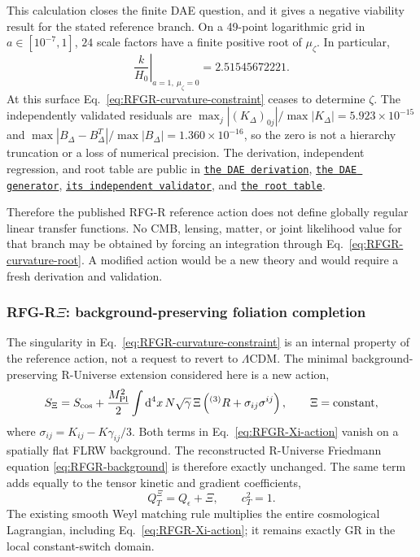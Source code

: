 \documentclass[11pt,a4paper]{article}
\renewcommand{\dd}{\mathrm{d}}
\newcommand{\mpl}{M_{\rm Pl}}
\newcommand{\RFGRepoURL}{https://github.com/MartinPetrasek123/MartinPetrasek123}
\newcommand{\RFGRepoNamed}[2]{\href{\RFGRepoURL/blob/main/r-universe-complete-chain/rfg-r-completion/r\_universe\_completion/#1}{\texttt{#2}}}
\begin{document}
This calculation closes the finite DAE question, and it gives a negative
viability result for the stated reference branch. On a 49-point logarithmic
grid in \(a\in[10^{-7},1]\), \(24\) scale factors have a finite positive root
of \(\mu_\zeta\). In particular,
\begin{equation}
 \left.\frac{k}{H_0}\right|_{a=1,\ \mu_\zeta=0}=2.51545672221 .
 \label{eq:RFGR-curvature-root}
\end{equation}
At this surface Eq.~\eqref{eq:RFGR-curvature-constraint} ceases to determine
\(\zeta\). The independently validated residuals are
\(\max_j|(K_\Delta)_{0j}|/\max|K_\Delta|=5.923\times10^{-15}\) and
\(\max|B_\Delta-B_\Delta^T|/\max|B_\Delta|=1.360\times10^{-16}\), so the
zero is not a hierarchy truncation or a loss of numerical precision. The
derivation, independent regression, and root table are public in
\RFGRepoNamed{docs/rfg\_dae\_closure.md}{the DAE derivation},
\RFGRepoNamed{scripts/rfg\_dae\_closure.py}{the DAE generator},
\RFGRepoNamed{scripts/validate\_rfg\_dae\_closure.py}{its independent validator}, and
\RFGRepoNamed{generated/tables/multifluid\_dae\_closure.csv}{the root table}.

Therefore the published RFG-R reference action does not define globally
regular linear transfer functions. No CMB, lensing, matter, or joint
likelihood value for that branch may be obtained by forcing an integration
through Eq.~\eqref{eq:RFGR-curvature-root}. A modified action would be a new
theory and would require a fresh derivation and validation.

\subsubsection{RFG-R\texorpdfstring{\(\Xi\)}{Xi}: background-preserving foliation completion}
\label{sec:rfgr-xi-completion}

The singularity in Eq.~\eqref{eq:RFGR-curvature-constraint} is an internal
property of the reference action, not a request to revert to \(\Lambda\)CDM.
The minimal background-preserving R-Universe extension considered here is a
new action,
\begin{equation}
 S_{\Xi}=S_{\rm cos}+
 \frac{\mpl^2}{2}\int\dd^4x\,N\sqrt{\gamma}\,
 \Xi\left({}^{(3)}R+\sigma_{ij}\sigma^{ij}\right),
 \qquad \Xi=\text{constant},
 \label{eq:RFGR-Xi-action}
\end{equation}
where \(\sigma_{ij}=K_{ij}-K\gamma_{ij}/3\). Both terms in
Eq.~\eqref{eq:RFGR-Xi-action} vanish on a spatially flat FLRW background.
The reconstructed R-Universe Friedmann equation
\eqref{eq:RFGR-background} is therefore exactly unchanged. The same term
adds equally to the tensor kinetic and gradient coefficients,
\begin{equation}
 Q_T^{\Xi}=Q_\epsilon+\Xi,\qquad c_T^2=1.
 \label{eq:RFGR-Xi-tensor}
\end{equation}
The existing smooth Weyl matching rule multiplies the entire cosmological
Lagrangian, including Eq.~\eqref{eq:RFGR-Xi-action}; it remains exactly GR in
the local constant-switch domain.
\end{document}
